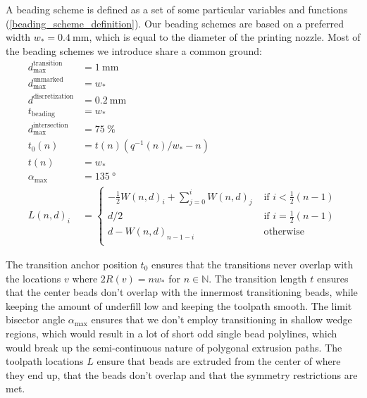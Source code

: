 A beading scheme is defined as a set of some particular variables and functions (\cref{beading_scheme_definition}).
Our beading schemes are based on a preferred width $w_* = \SI{0.4}{\milli\meter}$, which is equal to the diameter of the printing nozzle.
Most of the beading schemes we introduce share a common ground:
\begin{align*}
d_\text{max}^\text{transition} &= \SI{1}{\milli\meter} \\
d_\text{max}^\text{unmarked} &= w_* \\ 
d^\text{discretization} &= \SI{0.2}{\milli\meter} \\
t_\text{beading} &= w_* \\
d_\text{max}^\text{intersection} &= \SI{75}{\percent} \\
%
t_0(n) &=  t(n) \left( q^{-1}(n) / w_*  - n \right) \\
t(n) &= w_* \\
\alpha_\text{max} &= \SI{135}{\degree} \\
L(n,d)_i &= 
\begin{cases}
-\frac12 W(n,d)_i + \sum_{j=0}^i W(n,d)_j & \text{ if } i < \frac12 (n -1) \\
d/2 & \text{ if } i =  \frac12 (n -1) \\
d - W(n,d)_{n-1-i} & \text{ otherwise }\\
\end{cases}
\end{align*}

The transition anchor position $t_0$ ensures that the transitions never overlap with the locations $v$ where $2 R(v) = n w_*$ for $n \in \mathbb{N}$.
The transition length $t$ ensures that the center beads don't overlap with the innermost transitioning beads, while keeping the amount of underfill low and keeping the toolpath smooth.
The limit bisector angle $\alpha_\text{max}$ ensures that we don't employ transitioning in shallow wedge regions, which would result in a lot of short odd single bead polylines, which would break up the semi-continuous nature of polygonal extrusion paths.
The toolpath locations $L$ ensure that beads are extruded from the center of where they end up, that the beads don't overlap and that the symmetry restrictions are met.


